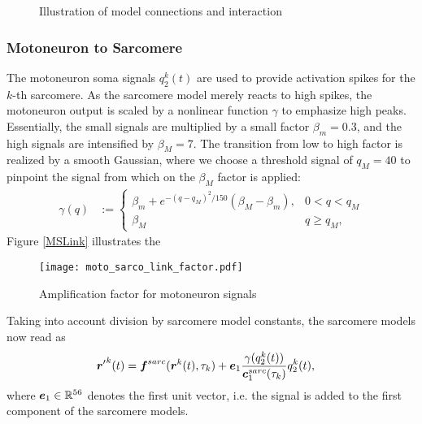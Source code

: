 \begin{figure}[!htp]
\begin{center}
%
    \end{center}%
    \caption{Illustration of model connections and interaction}
    \label{fig:modelconn}
\end{figure}

\subsubsection{Motoneuron to Sarcomere}
The motoneuron soma signals $q^k_2(t)$ are used to provide activation spikes for the $k$-th sarcomere.
As the sarcomere model merely reacts to high spikes, the motoneuron output is scaled by a nonlinear function $\gamma$ to emphasize high peaks.
Essentially, the small signals are multiplied by a small factor $\beta_m = 0.3$, and the high signals are intensified by $\beta_M = 7$.
The transition from low to high factor is realized by a smooth Gaussian,
where we choose a threshold signal of $q_M = 40$ to pinpoint the signal from which on the $\beta_M$ factor is applied:
\begin{align}
	\gamma(q) &:= \begin{cases}
		\beta_m + e^{-(q-q_M)^2/150}(\beta_M-\beta_m), & 0 < q < q_M\\
		\beta_M & q \geq q_M,
	\end{cases}
\end{align}
Figure \ref{MSLink} illustrates the 
\begin{figure}[!ht]
	\centering
	\texttt{[image: moto\_sarco\_link\_factor.pdf]}
	\caption{Amplification factor for motoneuron signals}
	\label{fig:MSLink}
\end{figure}
Taking into account division by sarcomere model constants, the sarcomere models now read as
\begin{align}
	{\boldsymbol{r}'}^k(t) &= \boldsymbol{f}^{sarc}(\boldsymbol{r}^k(t),\tau_k) + \boldsymbol{e}_1 \frac{\gamma(q_2^k(t))}{\boldsymbol{c}^{sarc}_1(\tau_k)}q_2^k(t),\label{def:sarcosys_plus_moto}
\end{align}
where $\boldsymbol{e}_1 \in \mathbb{R}^{56}$ denotes the first unit vector, i.e. the signal is added to the first component of the sarcomere models.

